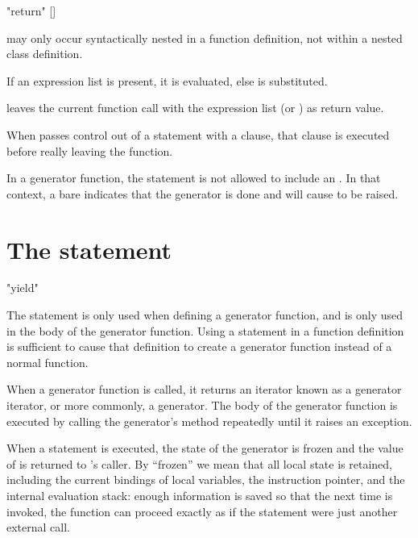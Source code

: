 \begin{productionlist}
             {"return" []}
\end{productionlist}

 may only occur syntactically nested in a function
definition, not within a nested class definition.

If an expression list is present, it is evaluated, else 
is substituted.

 leaves the current function call with the expression
list (or ) as return value.

When  passes control out of a  statement
with a  clause, that  clause is executed
before really leaving the function.

In a generator function, the  statement is not allowed
to include an .  In that context, a bare
 indicates that the generator is done and will cause
 to be raised.


\section{The  statement \label{yield}}

\begin{productionlist}
             {"yield" }
\end{productionlist}


The  statement is only used when defining a generator
function, and is only used in the body of the generator function.
Using a  statement in a function definition is
sufficient to cause that definition to create a generator function
instead of a normal function.

When a generator function is called, it returns an iterator known as a generator
iterator, or more commonly, a generator.  The body of the generator function is
executed by calling the generator's  method repeatedly until
it raises an exception.

When a  statement is executed, the state of the generator is
frozen and the value of  is returned to
's caller.  By ``frozen'' we mean that all local state is
retained, including the current bindings of local variables, the instruction
pointer, and the internal evaluation stack: enough information is saved so that
the next time  is invoked, the function can proceed exactly
as if the  statement were just another external call.

